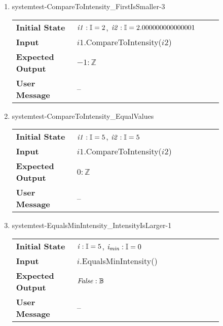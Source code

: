 \begin{enumerate}
    \item{systemtest-CompareToIntensity\_FirstIsSmaller-3}
    \begin{table}[H]
        \centering
        \begin{tabular}{P{0.25\linewidth}P{0.6\linewidth}}
            \toprule
            \textbf{Initial State} & $\mathit{i1} : \mathbb{I} = 2$,
            $\mathit{i2} : \mathbb{I} = 2.000000000000001$ \\
            \textbf{Input} & $\mathit{i1}$.CompareToIntensity($\mathit{i2}$) \\
            \midrule
            \textbf{Expected Output} & $-1 : \mathbb{Z}$ \\
            \textbf{User Message} & -- \\ \bottomrule
        \end{tabular}
    \end{table}

    \item{systemtest-CompareToIntensity\_EqualValues}
    \begin{table}[H]
        \centering
        \begin{tabular}{P{0.25\linewidth}P{0.6\linewidth}}
            \toprule
            \textbf{Initial State} & $\mathit{i1} : \mathbb{I} = 5$,
            $\mathit{i2} : \mathbb{I} = 5$ \\
            \textbf{Input} & $\mathit{i1}$.CompareToIntensity($\mathit{i2}$) \\
            \midrule
            \textbf{Expected Output} & $0 : \mathbb{Z}$ \\
            \textbf{User Message} & -- \\ \bottomrule
        \end{tabular}
    \end{table}

    \item{systemtest-EqualsMinIntensity\_IntensityIsLarger-1}
    \begin{table}[H]
        \centering
        \begin{tabular}{P{0.25\linewidth}P{0.6\linewidth}}
            \toprule
            \textbf{Initial State} & $\mathit{i} : \mathbb{I} = 5$,
            $\mathit{i_{min}} : \mathbb{I} = 0$ \\
            \textbf{Input} & $\mathit{i}$.EqualsMinIntensity() \\ \midrule
            \textbf{Expected Output} & $\mathit{False} : \mathbb{B}$ \\
            \textbf{User Message} & -- \\ \bottomrule
        \end{tabular}
    \end{table}




\end{enumerate}
